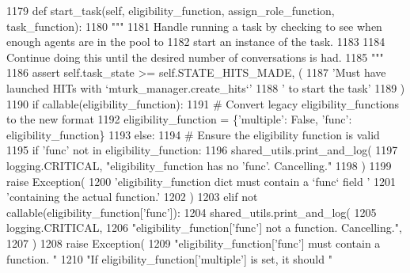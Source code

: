 \begin{DoxyCode}
1179     \textcolor{keyword}{def }start\_task(self, eligibility\_function, assign\_role\_function, task\_function):
1180         \textcolor{stringliteral}{"""}
1181 \textcolor{stringliteral}{        Handle running a task by checking to see when enough agents are in the pool to}
1182 \textcolor{stringliteral}{        start an instance of the task.}
1183 \textcolor{stringliteral}{}
1184 \textcolor{stringliteral}{        Continue doing this until the desired number of conversations is had.}
1185 \textcolor{stringliteral}{        """}
1186         \textcolor{keyword}{assert} self.task\_state >= self.STATE\_HITS\_MADE, (
1187             \textcolor{stringliteral}{'Must have launched HITs with `mturk\_manager.create\_hits`'}
1188             \textcolor{stringliteral}{' to start the task'}
1189         )
1190         \textcolor{keywordflow}{if} callable(eligibility\_function):
1191             \textcolor{comment}{# Convert legacy eligibility\_functions to the new format}
1192             eligibility\_function = \{\textcolor{stringliteral}{'multiple'}: \textcolor{keyword}{False}, \textcolor{stringliteral}{'func'}: eligibility\_function\}
1193         \textcolor{keywordflow}{else}:
1194             \textcolor{comment}{# Ensure the eligibility function is valid}
1195             \textcolor{keywordflow}{if} \textcolor{stringliteral}{'func'} \textcolor{keywordflow}{not} \textcolor{keywordflow}{in} eligibility\_function:
1196                 shared\_utils.print\_and\_log(
1197                     logging.CRITICAL, \textcolor{stringliteral}{"eligibility\_function has no 'func'. Cancelling."}
1198                 )
1199                 \textcolor{keywordflow}{raise} Exception(
1200                     \textcolor{stringliteral}{'eligibility\_function dict must contain a `func` field '}
1201                     \textcolor{stringliteral}{'containing the actual function.'}
1202                 )
1203             \textcolor{keywordflow}{elif} \textcolor{keywordflow}{not} callable(eligibility\_function[\textcolor{stringliteral}{'func'}]):
1204                 shared\_utils.print\_and\_log(
1205                     logging.CRITICAL,
1206                     \textcolor{stringliteral}{"eligibility\_function['func'] not a function. Cancelling."},
1207                 )
1208                 \textcolor{keywordflow}{raise} Exception(
1209                     \textcolor{stringliteral}{"eligibility\_function['func'] must contain a function. "}
1210                     \textcolor{stringliteral}{"If eligibility\_function['multiple'] is set, it should "}

\end{DoxyCode}
